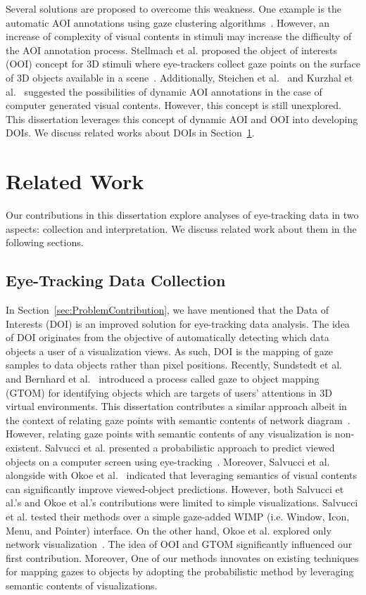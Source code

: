 Several solutions are proposed to overcome this weakness. One example is the automatic AOI annotations using gaze clustering algorithms~\cite{Pri00, San04, Dru14}. However, an increase of complexity of visual contents in stimuli may increase the difficulty of the AOI annotation process. Stellmach et al. proposed the object of interests (OOI) concept for 3D stimuli where eye-trackers collect gaze points on the surface of 3D objects available in a scene~\cite{Ste10}. Additionally, Steichen et al.~\cite{Ste13} and Kurzhal et al.~\cite{Kur14} suggested the possibilities of dynamic AOI annotations in the case of computer generated visual contents. However, this concept is still unexplored. This dissertation leverages this concept of dynamic AOI and OOI into developing DOIs. We discuss related works about DOIs in Section~\ref{sec:RelatedWorks}.

\section{Related Work}
\label{sec:RelatedWorks}
Our contributions in this dissertation explore analyses of eye-tracking data in two aspects: collection and interpretation. We discuss related work about them in the following sections.

\subsection{Eye-Tracking Data Collection} 
In Section~\ref{sec:ProblemContribution}, we have mentioned that the Data of Interests (DOI) is an improved solution for eye-tracking data analysis. The idea of DOI originates from the objective of automatically detecting which data objects a user of a visualization views. As such, DOI is the mapping of gaze samples to data objects rather than pixel positions. Recently, Sundstedt et al.~\cite{Sun13} and Bernhard et al.~\cite{Bern14} introduced a process called gaze to object mapping (GTOM) for identifying objects which are targets of users' attentions in 3D virtual environments. This dissertation contributes a similar approach albeit in the context of relating gaze points with semantic contents of network diagram~\cite{Okoe14}. However, relating gaze points with semantic contents of any visualization is non-existent. Salvucci et al. presented a probabilistic approach to predict viewed objects on a computer screen using eye-tracking~\cite{Sal00}. Moreover, Salvucci et al. alongside with Okoe et al.~\cite{Okoe14} indicated that leveraging semantics of visual contents can significantly improve viewed-object predictions. However, both Salvucci et al.'s and Okoe et al.'s contributions were limited to simple visualizations. Salvucci et al. tested their methods over a simple gaze-added WIMP (i.e. Window, Icon, Menu, and Pointer) interface. On the other hand, Okoe et al. explored only network visualization~\cite{Okoe14}. The idea of OOI and GTOM significantly influenced our first contribution. Moreover, One of our methods innovates on existing techniques for mapping gazes to objects by adopting the probabilistic method by leveraging semantic contents of visualizations.  


